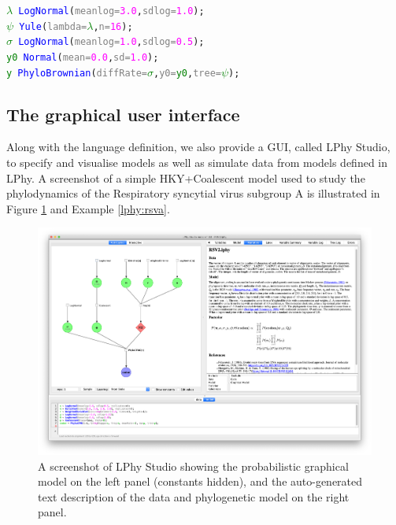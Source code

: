 \documentclass[10pt,letterpaper,table]{article}
\begin{document}
{{\small
\begin{alltt}
    \textcolor{green}{\(\lambda\)} ~ \textcolor{blue}{LogNormal}(\textcolor{gray}{meanlog=}\textcolor{magenta}{3.0}, \textcolor{gray}{sdlog=}\textcolor{magenta}{1.0});
    \textcolor{green}{\(\psi\)} ~ \textcolor{blue}{Yule}(\textcolor{gray}{lambda=}\textcolor{green}{\(\lambda\)}, \textcolor{gray}{n=}\textcolor{magenta}{16});
    \textcolor{green}{\(\sigma\)} ~ \textcolor{blue}{LogNormal}(\textcolor{gray}{meanlog=}\textcolor{magenta}{1.0}, \textcolor{gray}{sdlog=}\textcolor{magenta}{0.5});
    \textcolor{green}{y0} ~ \textcolor{blue}{Normal}(\textcolor{gray}{mean=}\textcolor{magenta}{0.0}, \textcolor{gray}{sd=}\textcolor{magenta}{1.0});
    \textcolor{green}{y} ~ \textcolor{blue}{PhyloBrownian}(\textcolor{gray}{diffRate=}\textcolor{green}{\(\sigma\)}, \textcolor{gray}{y0=}\textcolor{green}{y0}, \textcolor{gray}{tree=}\textcolor{green}{\(\psi\)});
\end{alltt}
}

\subsection{The graphical user interface} 
Along with the language definition, we also provide a GUI, called LPhy Studio, to specify and visualise models as well as simulate data from models defined in LPhy. A screenshot of a simple HKY+Coalescent model used to study the phylodynamics of the Respiratory syncytial virus subgroup A \cite{zlateva2004molecular} is illustrated in Figure \ref{fig:lphystudio} and Example \ref{lphy:rsva}.

\begin{figure}
  \includegraphics[width=\textwidth]{figs/lphystudio_screenshot.png}
  \caption{A screenshot of LPhy Studio showing the probabilistic graphical model 
  on the left panel (constants hidden), and the auto-generated text description of the data and phylogenetic model on the right panel.} 
  \label{fig:lphystudio}
\end{figure}

}
\end{document}

